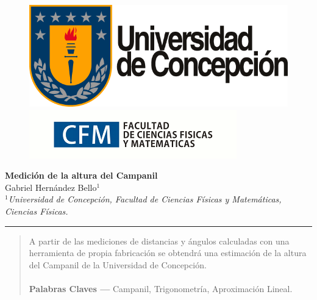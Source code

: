 \documentclass[10pt,a4paper]{article}
\author{Gabriel Hernandez Bello}
\begin{document}
	
	\begin{figure}[H]
		\raggedright
		\includegraphics[scale=0.2]{IMG/logo_udec.png} \hfill \includegraphics[scale=0.5]{IMG/cfm_logo.png}
	\end{figure}

	\vspace{6mm}
	\begin{center}
		{\Large \textbf{Medición de la altura del Campanil}}\\
		\vspace{2mm}
		{\large Gabriel Hernández Bello$^{1}$}\\
		\vspace{6.5mm}
		$^1$\textit{Universidad de Concepción, Facultad de Ciencias Físicas y Matemáticas, Ciencias Físicas. }\\
	\end{center}

	\begin{center}
		\textcolor{pinegreen}{\rule{150mm}{0.8mm}}
	\end{center}

	\begin{abstract}
	A partir de las mediciones de distancias y ángulos calculadas con una herramienta de propia fabricación se obtendrá una estimación de la altura del Campanil de la Universidad de Concepción.\\
	\\
		\textbf{Palabras Claves ---}  Campanil, Trigonometría, Aproximación Lineal.
	\end{abstract}
	
\end{document}
